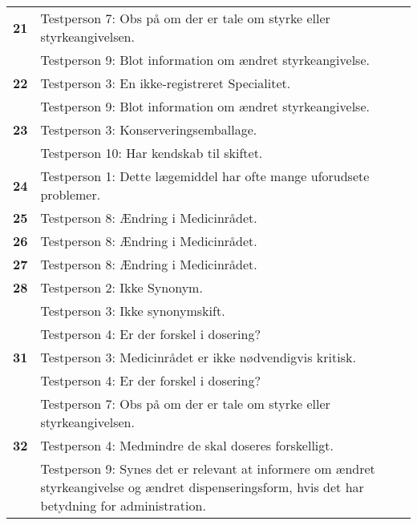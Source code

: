 \begin{longtable} {|p{2.2cm}|p{12cm}|}
\cellcolor[HTML]{C0C0C0}\textbf{21}\multirow{2}{*}{} & Testperson 7: Obs på om der er tale om styrke eller styrkeangivelsen. \\ \cline{2-2}
\cellcolor[HTML]{C0C0C0}  & Testperson 9: Blot information om ændret styrkeangivelse. \\ \hline
\cellcolor[HTML]{C0C0C0}\textbf{22}\multirow{2}{*}{} & Testperson 3: En ikke-registreret Specialitet. \\ \cline{2-2}
\cellcolor[HTML]{C0C0C0}  & Testperson 9: Blot information om ændret styrkeangivelse. \\ \hline
\cellcolor[HTML]{C0C0C0}\textbf{23}\multirow{2}{*}{} & Testperson 3: Konserveringsemballage. \\ \cline{2-2}
\cellcolor[HTML]{C0C0C0}           & Testperson 10: Har kendskab til skiftet. \\ \hline
\cellcolor[HTML]{C0C0C0}\textbf{24} & Testperson 1: Dette lægemiddel har ofte mange uforudsete problemer. \\ \hline
\cellcolor[HTML]{C0C0C0}\textbf{25} & Testperson 8: Ændring i Medicinrådet. \\ \hline
\cellcolor[HTML]{C0C0C0}\textbf{26} & Testperson 8: Ændring i Medicinrådet. \\ \hline
\cellcolor[HTML]{C0C0C0}\textbf{27} & Testperson 8: Ændring i Medicinrådet. \\ \hline
\cellcolor[HTML]{C0C0C0}\textbf{28}\multirow{3}{*}{} & Testperson 2: Ikke Synonym. \\ \cline{2-2}
\cellcolor[HTML]{C0C0C0}      & Testperson 3: Ikke synonymskift. \\ \cline{2-2}
 \cellcolor[HTML]{C0C0C0}                    & Testperson 4: Er der forskel i dosering? \\ \hline
\cellcolor[HTML]{C0C0C0}\textbf{31}\multirow{3}{*}{} & Testperson 3: Medicinrådet er ikke nødvendigvis kritisk. \\ \cline{2-2}
\cellcolor[HTML]{C0C0C0}     & Testperson 4: Er der forskel i dosering? \\ \cline{2-2}
\cellcolor[HTML]{C0C0C0}   & Testperson 7: Obs på om der er tale om styrke eller styrkeangivelsen. \\ \hline
\cellcolor[HTML]{C0C0C0}\textbf{32}\multirow{2}{*}{} & Testperson 4: Medmindre de skal doseres forskelligt. \\ \cline{2-2}
\cellcolor[HTML]{C0C0C0}  & Testperson 9: Synes det er relevant at informere om ændret styrkeangivelse og ændret dispenseringsform, hvis det har betydning for administration. \\ \hline

\end{longtable}
